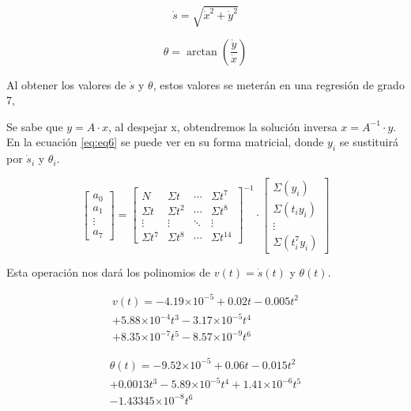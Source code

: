 \documentclass[spanish,10pt,letterpaper, twocolumn]{article}
\providecommand{\e}[1]{\ensuremath{\times 10^{#1}}}
\begin{document}
\begin{equation}
	\label{eq:eq4}
	\dot{s}=\sqrt{\dot{x}^2+\dot{y}^2}
\end{equation} 

\begin{equation}
	\label{eq:eq5}
	\theta=\arctan\left(\frac{\dot{y}}{\dot{x}}\right)	
\end{equation}

Al obtener los valores de $\dot{s}$ y $\theta$, estos valores se meter\'an en una regresi\'on de grado 7, 

Se sabe que $y=A \cdot x$, al despejar x, obtendremos la soluci\'on inversa $x=A^{-1} \cdot y$. En la ecuaci\'on \eqref{eq:eq6} se puede ver en su forma matricial, donde $y_i$ se sustituir\'a por $\dot{s}_i$ y $\theta_i$. 

\begin{equation}
\label{eq:eq6}
\begin{bmatrix}
	a_0 \\
	a_1 \\
	\vdots \\
	a_7
\end{bmatrix}
	=
\begin{bmatrix}
	N & \Sigma t  & \cdots & \Sigma t^7\\
	\Sigma t & \Sigma t^2  & \cdots & \Sigma t^8\\
	\vdots & \vdots & \ddots & \vdots \\
	\Sigma t^7 & \Sigma t^8 & \cdots & \Sigma t^{14}
\end{bmatrix} ^{-1}
\cdot
\begin{bmatrix}
	\Sigma(y_i)\\
	\Sigma(t_iy_i)\\
	\vdots \\
	\Sigma(t_i^7y_i)
\end{bmatrix}
\end{equation}

Esta operaci\'on nos dar\'a los polinomios de $v(t)=\dot{s}(t)$ y $\theta(t)$.

\begin{equation}
	\label{eq:eq7}
	\begin{matrix}
	v(t)=-4.19\e{-5}+0.02t-0.005t^2\\
	+5.88\e{-4}t^3-3.17\e{-5}t^4\\
	+8.35\e{-7}
t^5-8.57\e{-9}t^6
	\end{matrix}
\end{equation}

\begin{equation}
	\label{eq:eq8}
	\begin{matrix}
	\theta(t)=-9.52\e{-5}+0.06t-0.015t^2\\
	+0.0013t^3-5.89\e{-5}t^4+1.41\e{-6}t^5\\
	-1.43345\e{-8}t^6
	\end{matrix}
\end{equation}
\end{document}
